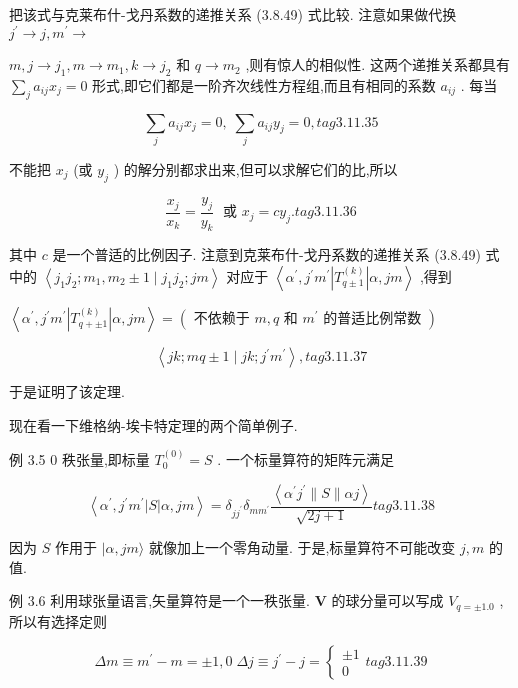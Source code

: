 把该式与克莱布什-戈丹系数的递推关系 (3.8.49) 式比较. 注意如果做代换 ${j}^{\prime } \rightarrow j,{m}^{\prime } \rightarrow$

$m, j \rightarrow {j}_{1}, m \rightarrow {m}_{1}, k \rightarrow {j}_{2}$ 和 $q \rightarrow {m}_{2}$ ,则有惊人的相似性. 这两个递推关系都具有 $\mathop{\sum }\limits_{j}{a}_{ij}{x}_{j} = 0$ 形式,即它们都是一阶齐次线性方程组,而且有相同的系数 ${a}_{ij}$ . 每当

$$
\mathop{\sum }\limits_{j}{a}_{ij}{x}_{j} = 0,\;\mathop{\sum }\limits_{j}{a}_{ij}{y}_{j} = 0, tag{3.11.35}
$$

不能把 ${x}_{j}$ (或 ${y}_{j}$ ) 的解分别都求出来,但可以求解它们的比,所以

$$
\frac{{x}_{j}}{{x}_{k}} = \frac{{y}_{j}}{{y}_{k}}\;\text{ 或 }{x}_{j} = c{y}_{j}. tag{3.11.36}
$$

其中 $c$ 是一个普适的比例因子. 注意到克莱布什-戈丹系数的递推关系 (3.8.49) 式中的 $\left\langle {{j}_{1}{j}_{2};{m}_{1},{m}_{2} \pm 1 \mid {j}_{1}{j}_{2};{jm}}\right\rangle$ 对应于 $\left\langle {{\alpha }^{\prime },{j}^{\prime }{m}^{\prime }\left| {T}_{q \pm 1}^{\left( k\right) }\right| \alpha ,{jm}}\right\rangle$ ,得到

$\left\langle {{\alpha }^{\prime },{j}^{\prime }{m}^{\prime }\left| {T}_{q + \pm 1}^{\left( k\right) }\right| \alpha ,{jm}}\right\rangle = \left( {\text{ 不依赖于 }m, q\text{ 和 }{m}^{\prime }\text{ 的普适比例常数 }}\right)$

$$
\left\langle {{jk};{mq} \pm 1 \mid {jk};{j}^{\prime }{m}^{\prime }}\right\rangle , tag{3.11.37}
$$

于是证明了该定理.

现在看一下维格纳-埃卡特定理的两个简单例子.

例 3.5 0 秩张量,即标量 ${T}_{0}^{\left( 0\right) } = S$ . 一个标量算符的矩阵元满足

$$
\left\langle {{\alpha }^{\prime },{j}^{\prime }{m}^{\prime }\left| S\right| \alpha ,{jm}}\right\rangle = {\delta }_{j{j}^{\prime }}{\delta }_{m{m}^{\prime }}\frac{\left\langle {\alpha }^{\prime }{j}^{\prime }\parallel S\parallel \alpha j\right\rangle }{\sqrt{{2j} + 1}} tag{3.11.38}
$$

因为 $S$ 作用于 $|\alpha ,{jm}\rangle$ 就像加上一个零角动量. 于是,标量算符不可能改变 $j, m$ 的值.

例 3.6 利用球张量语言,矢量算符是一个一秩张量. $\mathbf{V}$ 的球分量可以写成 ${V}_{q = \pm {1.0}}$ ,所以有选择定则

$$
{\Delta m} \equiv {m}^{\prime } - m = \pm 1,0\;{\Delta j} \equiv {j}^{\prime } - j = \left\{ \begin{array}{l} \pm 1 \\ 0 \end{array}\right. tag{3.11.39}
$$

